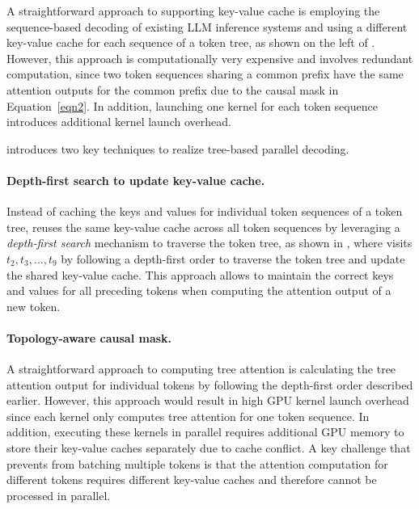 A straightforward approach to supporting key-value cache is employing the sequence-based decoding of existing LLM inference systems and using a different key-value cache for each sequence of a token tree, as shown on the left of .
However, this approach is computationally very expensive and involves redundant computation, since two token sequences sharing a common prefix have the same attention outputs for the common prefix due to the causal mask in Equation~\ref{eqn2}.
In addition, launching one kernel for each token sequence introduces additional kernel launch overhead.

\Sys introduces two key techniques to realize tree-based parallel decoding.

\paragraph{Depth-first search to update key-value cache.} Instead of caching the keys and values for individual token sequences of a token tree, \Sys reuses the same key-value cache across all token sequences by leveraging a {\em depth-first search} mechanism to traverse the token tree, as shown in , where \Sys visits $t_2,t_3,...,t_9$ by following a depth-first order to traverse the token tree and update the shared key-value cache.
This approach allows \Sys to maintain the correct keys and values for all preceding tokens when computing the attention output of a new token.

\paragraph{Topology-aware causal mask.} A straightforward approach to computing tree attention is calculating the tree attention output for individual tokens by following the depth-first order described earlier. 
However, this approach would result in high GPU kernel launch overhead since each kernel only computes tree attention for one token sequence.
In addition, executing these kernels in parallel requires additional GPU memory to store their key-value caches separately due to cache conflict.
A key challenge that prevents \Sys from batching multiple tokens is that the attention computation for different tokens requires different key-value caches and therefore cannot be processed in parallel.

